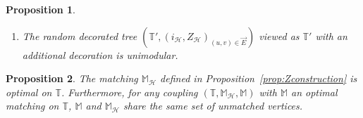 \documentclass[10pt,a4paper]{amsart}
\newtheorem{prop}{Proposition}
\begin{document}
\begin{prop}
\begin{enumerate}[label=\roman*)]
        \item The random decorated tree $(\mathbb{T}', (i_{\mathcal{H}},Z_{\mathcal{H}})_{(u,v) \in \overset{\rightarrow}{E}})$ viewed as $\mathbb{T}'$ with an additional decoration is unimodular.
        \end{enumerate}
\end{prop}

\begin{prop}\label{prop:optimality}
    The matching  $\mathbb{M}_{\mathcal{H}}$ defined in Proposition~\ref{prop:Zconstruction} is optimal on $\mathbb{T}$. Furthermore, for any coupling $(\mathbb{T},\mathbb{M}_{\mathcal{H}},\mathbb{M})$ with $\mathbb{M}$ an optimal matching on $\mathbb{T}$, $\mathbb{M}$ and $\mathbb{M}_{\mathcal{H}}$ share the same set of unmatched vertices.
\end{prop}
\end{document}
